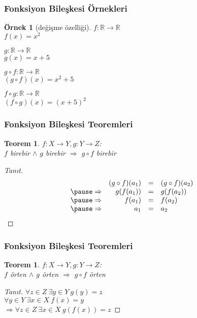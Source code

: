 \documentclass[dvipsnames]{beamer}
\theoremstyle{definition}
\theoremstyle{example}
\newtheorem{ornek}[theorem]{Örnek}
\theoremstyle{plain}
\newtheorem{teorem}[theorem]{Teorem}
\begin{document}
\begin{frame}
  \frametitle{Fonksiyon Bileşkesi Örnekleri}

  \begin{ornek}[değişme özelliği]
    $f: \mathbb{R} \rightarrow \mathbb{R}$\\
    $f(x) = x^2$

    \medskip
    $g: \mathbb{R} \rightarrow \mathbb{R}$\\
    $g(x) = x + 5$

    \pause
    \bigskip
    $g \circ f: \mathbb{R} \rightarrow \mathbb{R}$\\
    $(g \circ f)(x) = x^2 + 5$

    \pause
    \medskip
    $f \circ g: \mathbb{R} \rightarrow \mathbb{R}$\\
    $(f \circ g)(x) = (x + 5)^2$
  \end{ornek}
\end{frame}

\begin{frame}
  \frametitle{Fonksiyon Bileşkesi Teoremleri}

  \begin{teorem}
    $f: X \rightarrow Y, g: Y \rightarrow Z$:\\
    $f$ birebir $\wedge$ $g$ birebir $\Rightarrow$ $g \circ f$ birebir
  \end{teorem}

  \pause
  \begin{proof}[Tanıt]
    \[\begin{array}{crcl}
                & (g \circ f) (a_1) & = & (g \circ f) (a_2)\\\pause
    \Rightarrow & g(f(a_1))         & = & g(f(a_2))\\\pause
    \Rightarrow & f(a_1)            & = & f(a_2)\\\pause
    \Rightarrow & a_1               & = & a_2
    \end{array}\]
  \end{proof}
\end{frame}

\begin{frame}
  \frametitle{Fonksiyon Bileşkesi Teoremleri}

  \begin{teorem}
    $f: X \rightarrow Y, g: Y \rightarrow Z$:\\
    $f$ örten $\wedge$ $g$ örten $\Rightarrow$ $g \circ f$ örten
  \end{teorem}

  \pause
  \begin{proof}[Tanıt]
    $\forall z \in Z~\exists y \in Y~g(y) = z$\\\pause
    $\forall y \in Y~\exists x \in X~f(x) = y$\\\pause
      $\Rightarrow \forall z \in Z~\exists x \in X~g(f(x)) = z$
  \end{proof}
\end{frame}
\end{document}
